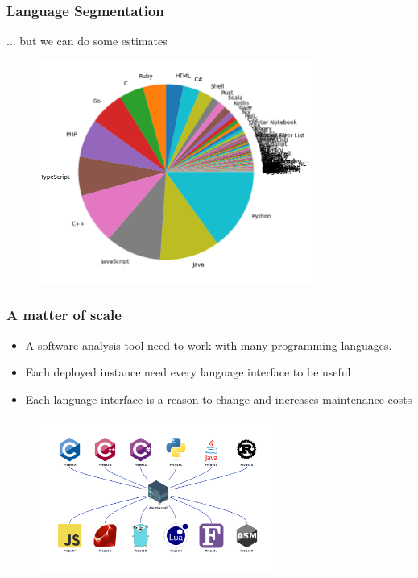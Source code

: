 \documentclass[dvipsnames, 10pt, table]{beamer}
\begin{document}
\begin{frame}
  \frametitle{Language Segmentation}
  ... but we can do some estimates
  \begin{figure}
    \begin{center}
      \includegraphics[width=0.8\textwidth]{figures/githut/statistics.png}
    \end{center}
  \end{figure}
\end{frame}

\begin{frame}
  \frametitle{A matter of scale}
  \begin{itemize}
    \item A software analysis tool need to work with many programming languages.
    \item Each deployed instance need every language interface to be useful
    \item Each language interface is a reason to change and increases maintenance costs
  \end{itemize}
  \begin{figure}
    \begin{center}
      \includegraphics[width=0.7\textwidth]{figures/githut/problem-many-languages.png}
    \end{center}
  \end{figure}
\end{frame}
\end{document}

